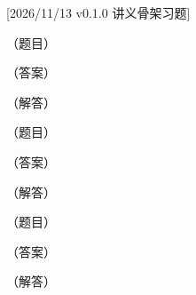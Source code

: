 %
[2026/11/13 v0.1.0 讲义骨架习题]
\begin{exercise}[title={基础题},level=basic]
（题目）
\begin{answer}（答案）\end{answer}
\begin{solution}（解答）\end{solution}
\end{exercise}
\begin{exercise}[title={常规题},level=standard]
（题目）
\begin{answer}（答案）\end{answer}
\begin{solution}（解答）\end{solution}
\end{exercise}
\begin{exercise}[title={提高题},level=advanced]
（题目）
\begin{answer}（答案）\end{answer}
\begin{solution}（解答）\end{solution}
\end{exercise}
